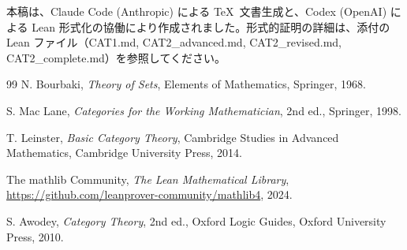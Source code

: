 \documentclass[a4paper,12pt]{ltjsarticle}
\theoremstyle{definition}
\begin{document}
本稿は、Claude Code (Anthropic) による \TeX\ 文書生成と、Codex (OpenAI) による Lean 形式化の協働により作成されました。形式的証明の詳細は、添付の Lean ファイル（CAT1.md, CAT2\_advanced.md, CAT2\_revised.md, CAT2\_complete.md）を参照してください。

\begin{thebibliography}{99}
N. Bourbaki, \textit{Theory of Sets}, Elements of Mathematics, Springer, 1968.

S. Mac Lane, \textit{Categories for the Working Mathematician}, 2nd ed., Springer, 1998.

T. Leinster, \textit{Basic Category Theory}, Cambridge Studies in Advanced Mathematics, Cambridge University Press, 2014.

The mathlib Community, \textit{The Lean Mathematical Library}, \url{https://github.com/leanprover-community/mathlib4}, 2024.

S. Awodey, \textit{Category Theory}, 2nd ed., Oxford Logic Guides, Oxford University Press, 2010.
\end{thebibliography}
\end{document}
